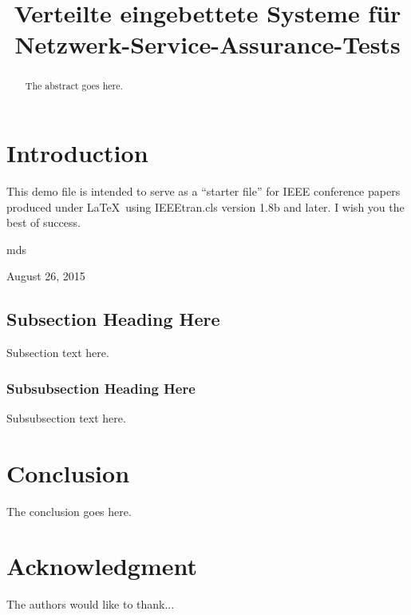 \documentclass[conference]{IEEEtran}
\begin{document}
\title{Verteilte eingebettete Systeme für Netzwerk-Service-Assurance-Tests}
\author{
}

\maketitle

\begin{abstract}
The abstract goes here.
\end{abstract}

\IEEEpeerreviewmaketitle



\section{Introduction}
This demo file is intended to serve as a ``starter file''
for IEEE conference papers produced under \LaTeX\ using
IEEEtran.cls version 1.8b and later.
I wish you the best of success.

\hfill mds

\hfill August 26, 2015

\subsection{Subsection Heading Here}
Subsection text here.


\subsubsection{Subsubsection Heading Here}
Subsubsection text here.


\section{Conclusion}
The conclusion goes here.

\section*{Acknowledgment}


The authors would like to thank...
\end{document}
